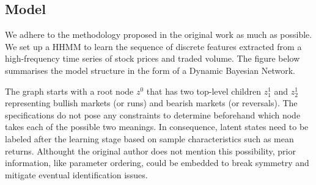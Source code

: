 \documentclass[]{article}
\begin{document}
\subsection{Model}\label{model}

\label{sec:model}

We adhere to the methodology proposed in the original work as much as
possible. We set up a HHMM to learn the sequence of discrete features
extracted from a high-frequency time series of stock prices and traded
volume. The figure below summarises the model structure in the form of a
Dynamic Bayesian Network.

The graph starts with a root node \(z^0\) that has two top-level
children \(z_1^1\) and \(z_2^1\) representing bullish markets (or runs)
and bearish markets (or reversals). The specifications do not pose any
constraints to determine beforehand which node takes each of the
possible two meanings. In consequence, latent states need to be labeled
after the learning stage based on sample characteristics such as mean
returns. Althought the original author does not mention this
possibility, prior information, like parameter ordering, could be
embedded to break symmetry and mitigate eventual identification issues.

\end{document}
